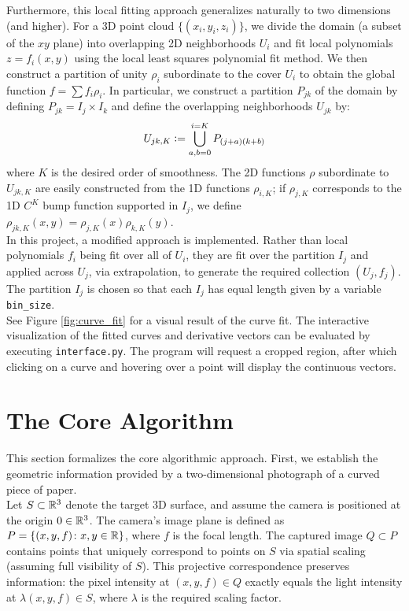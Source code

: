 \documentclass{article}
\begin{document}
Furthermore, this local fitting approach generalizes naturally to two dimensions (and higher). For a 3D point cloud $\{(x_i, y_i, z_i)\}$, we divide the domain (a subset of the $xy$ plane) into overlapping 2D neighborhoods $U_i$ and
fit local polynomials $z=f_i(x, y)$ using the local least squares polynomial fit method. We then construct a partition of unity $\rho_i$ subordinate to the cover $U_i$ to obtain the global function $f = \sum f_i \rho_i$.
In particular, we construct a partition $P_{jk}$ of the domain by defining $P_{jk} = I_j \times I_k$ and define the overlapping neighborhoods $U_{jk}$ by:
\[
  U_{jk, K} \vcentcolon= \bigcup_{a,b=0}^{i=K}P_{(j+a) (k+b)}
\]
where $K$ is the desired order of smoothness. The 2D functions $\rho$ subordinate to $U_{jk, K}$ are easily constructed from the 1D functions $\rho_{i, K}$; if $\rho_{j,K}$
corresponds to the 1D $C^K$ bump function supported in $I_j$, we define $\rho_{jk, K}(x, y) = \rho_{j,K}(x)\rho_{k,K}(y)$. \\

In this project, a modified approach is implemented. Rather than local polynomials $f_i$ being fit over all of $U_i$, they are fit over the partition $I_j$ and applied across $U_j$, via extrapolation, to generate the 
required collection $(U_j, f_j)$. The 
partition $I_j$ is chosen so that each $I_j$ has equal length given by a variable \verb|bin_size|. \\ 

See Figure \ref{fig:curve_fit} for a visual result of the curve fit. The interactive visualization of the fitted curves and derivative vectors can be evaluated by executing \verb|interface.py|. The program will request a cropped region, after which clicking on a curve and hovering over a point will display the continuous vectors.

\section{The Core Algorithm}\label{sec.core}
This section formalizes the core algorithmic approach. First, we establish the geometric information provided by a two-dimensional photograph of a curved piece of paper. \\

Let $S \subset \mathbb{R}^3$ denote the target 3D surface, and assume the camera is positioned at the origin $0 \in \mathbb{R}^3$. The camera's image plane is defined as $P = \{(x, y, f) \colon x, y \in \mathbb{R}\}$, where $f$ is the focal length. The captured image $Q \subset P$ contains points that uniquely correspond to points on $S$ via spatial scaling (assuming full visibility of $S$). This projective correspondence preserves information: the pixel intensity at $(x, y, f) \in Q$ exactly equals the light intensity at $\lambda(x, y, f) \in S$, where $\lambda$ is the required scaling factor. \\
\end{document}
